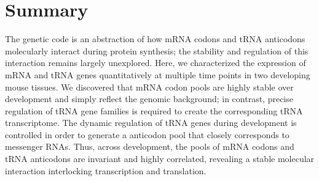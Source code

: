 \chapter*{Summary}

The genetic code is an abstraction of how mRNA codons and tRNA anticodons molecularly interact during protein synthesis; the stability and regulation of this interaction remains largely unexplored. Here, we characterized the expression of mRNA and tRNA genes quantitatively at multiple time points in two developing mouse tissues. We discovered that mRNA codon pools are highly stable over development and simply reflect the genomic background; in contrast, precise regulation of tRNA gene families is required to create the corresponding tRNA transcriptome. The dynamic regulation of tRNA genes during development is controlled in order to generate a anticodon pool that closely corresponds to messenger RNAs. Thus, across development, the pools of mRNA codons and tRNA anticodons are invariant and highly correlated, revealing a stable molecular interaction interlocking transcription and translation.
